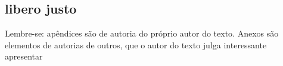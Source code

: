 \documentclass[
	12pt,				%
	openright,			%
	oneside,			%
	a4paper,			%
	english,			%
	brazil				%
	]{abntex2}
\begin{document}
\lipsum[21]

\postextual

\printbibliography%

%
%

\begin{apendicesenv}


\chapter{libero justo}
Lembre-se: apêndices são de autoria do próprio autor do texto. Anexos são elementos de autorias de outros, que o autor do texto julga interessante apresentar


\end{apendicesenv}
\end{document}
